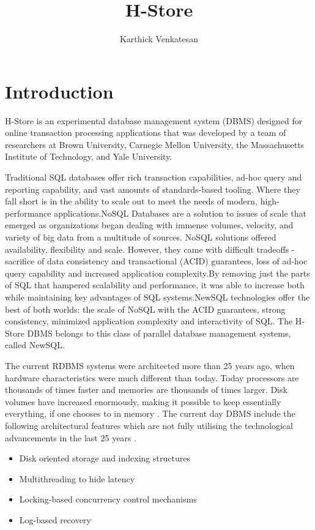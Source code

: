 \documentclass[9pt,twocolumn,twoside]{../../styles/osajnl}
\title{H-Store}
\author[1,*,+]{Karthick Venkatesan}
\affil[1]{School of Informatics and Computing, Bloomington, IN 47408, U.S.A.}
\affil[*]{Corresponding authors: vkarthickprabu@gmail.com}
\affil[+]{HID - S17-IO-3023}
\begin{document}
\maketitle

\section{Introduction}

H-Store is an experimental database management system (DBMS) designed for 
online transaction processing applications 
that was developed by a team of researchers  at Brown University, Carnegie 
Mellon University, the Massachusetts Institute of Technology, and Yale 
University.

Traditional SQL databases offer rich transaction capabilities, ad-hoc query and reporting capability, and vast amounts of standards-based tooling. Where they 
fall short is in the ability to scale out to meet the needs of modern, 
high-performance applications.NoSQL Databases are a solution to issues of scale that 
emerged as organizations began dealing with immense volumes, velocity, and 
variety of big data from a multitude of sources. NoSQL solutions offered 
availability, flexibility and scale. However, they came with difficult 
tradeoffs - sacrifice of data consistency and transactional (ACID) guarantees, 
loss of ad-hoc query capability and increased application complexity.By 
removing just the parts of SQL that hampered scalability and performance, it 
was able to increase both while maintaining key advantages of SQL 
systems.NewSQL technologies offer the best of both worlds: the scale of NoSQL 
with the ACID guarantees, strong consistency, minimized application complexity 
and interactivity of SQL. The H-Store DBMS belongs to this class of parallel 
database management systems, called NewSQL.

The current RDBMS systems were architected 
more than 25 years ago, when
hardware characteristics were much different than today.
Today processors are thousands of times faster and memories are
thousands of times larger. Disk volumes have increased
enormously, making it possible to keep essentially everything, if
one chooses to in memory \cite{stonebraker2007}. The current day DBMS 
include the following architectural features which are not fully utilising 
the technological advancements in the last 25 years  .
\begin{itemize}
\renewcommand{\labelitemi}{\scriptsize$\bullet$} 
\item Disk oriented storage and indexing structures
\item Multithreading to hide latency
\item Locking-based concurrency control mechanisms
\item Log-based recovery
\end{itemize}
\end{document}
